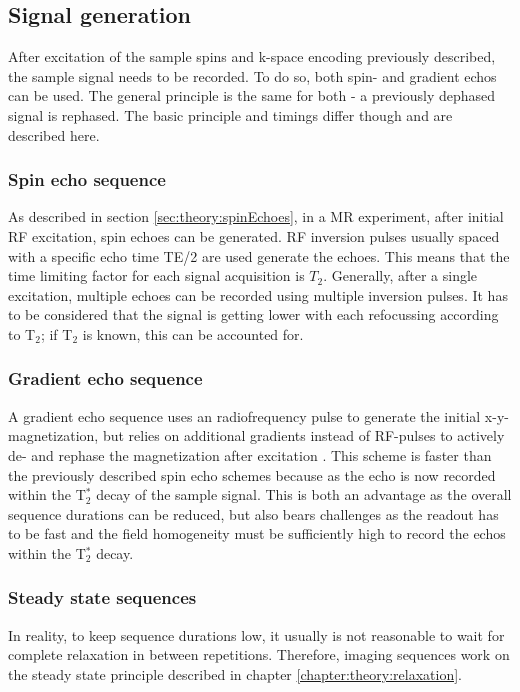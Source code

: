         \subsection{Signal generation}
        After excitation of the sample spins and k-space encoding previously described, the sample signal needs to be recorded. To do so, both spin- and gradient echos can be used. The general principle is the same for both - a previously dephased signal is rephased. The basic principle and timings differ though and are described here. 
        \subsubsection{Spin echo sequence}
            As described in section \ref{sec:theory:spinEchoes}, in a MR experiment, after initial RF excitation, spin echoes can be generated. RF inversion pulses usually spaced with a specific echo time TE/2 are used generate the echoes. This means that the time limiting factor for each signal acquisition is $T_2$. Generally, after a single excitation, multiple echoes can be recorded using multiple inversion pulses. It has to be considered that the signal is getting lower with each refocussing according to T$_2$; if T$_2$ is known, this can be accounted for.
        \subsubsection{Gradient echo sequence}
        \label{sec:theory:gradientEcho}
        A gradient echo sequence uses an radiofrequency pulse to generate the initial x-y-magnetization, but relies on additional gradients instead of RF-pulses to actively de- and rephase the magnetization after excitation \cite{brown_mri_2005}. This scheme is faster than the previously described spin echo schemes because as the echo is now recorded within the T$_2^*$ decay of the sample signal. This is both an advantage as the overall sequence durations can be reduced, but also bears challenges as the readout has to be fast and the field homogeneity must be sufficiently high to record the echos within the T$_2^*$ decay.
        \subsubsection{Steady state sequences}
        In reality, to keep sequence durations low, it usually is not reasonable to wait for complete relaxation in between repetitions. Therefore, imaging sequences work on the steady state principle described in chapter \ref{chapter:theory:relaxation}.
